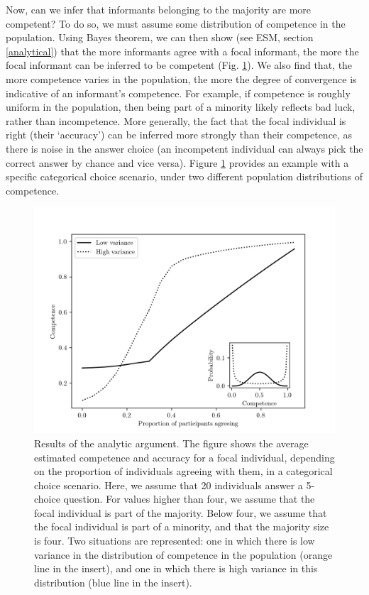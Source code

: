 \documentclass[
  doc,floatsintext]{apa6}
\begin{document}
Now, can we infer that informants belonging to the majority are more competent? To do so, we must assume some distribution of competence in the population. Using Bayes theorem, we can then show (see ESM, section \ref{analytical}) that the more informants agree with a focal informant, the more the focal informant can be inferred to be competent (Fig. \ref{fig:figure-Benoit-2}). We also find that, the more competence varies in the population, the more the degree of convergence is indicative of an informant's competence. For example, if competence is roughly uniform in the population, then being part of a minority likely reflects bad luck, rather than incompetence. More generally, the fact that the focal individual is right (their `accuracy') can be inferred more strongly than their competence, as there is noise in the answer choice (an incompetent individual can always pick the correct answer by chance and vice versa). Figure \ref{fig:figure-Benoit-2} provides an example with a specific categorical choice scenario, under two different population distributions of competence.



\begin{figure}

\includegraphics[width=0.75\linewidth]{figures/figure_Benoit-2} \hfill{}

\caption{Results of the analytic argument. The figure shows the average estimated competence and accuracy for a focal individual, depending on the proportion of individuals agreeing with them, in a categorical choice scenario. Here, we assume that 20 individuals answer a 5-choice question. For values higher than four, we assume that the focal individual is part of the majority. Below four, we assume that the focal individual is part of a minority, and that the majority size is four. Two situations are represented: one in which there is low variance in the distribution of competence in the population (orange line in the insert), and one in which there is high variance in this distribution (blue line in the insert).}\label{fig:figure-Benoit-2}
\end{figure}
\end{document}

